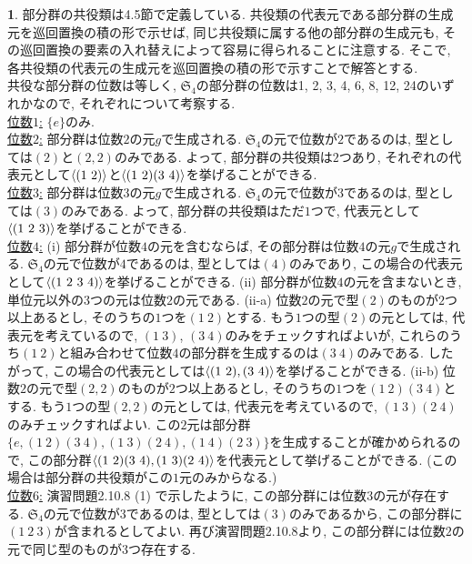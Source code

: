 \documentclass{amsart}
\theoremstyle{definition}
\newtheorem{ans}{}
\numberwithin{ans}{subsection}
\DeclarePairedDelimiter{\gen}{\langle}{\rangle}
\begin{document}
\begin{ans}
  部分群の共役類は4.5節で定義している.
  共役類の代表元である部分群の生成元を巡回置換の積の形で示せば, 同じ共役類に属する他の部分群の生成元も, その巡回置換の要素の入れ替えによって容易に得られることに注意する.
  そこで, 各共役類の代表元の生成元を巡回置換の積の形で示すことで解答とする.\\
  共役な部分群の位数は等しく, $\mathfrak{S}_4$の部分群の位数は1, 2, 3, 4, 6, 8, 12, 24のいずれかなので, それぞれについて考察する.\\
  \underline{位数$1$:}
  $\{e\}$のみ. \\
  \underline{位数$2$:}
  部分群は位数$2$の元$g$で生成される.
  $\mathfrak{S}_4$の元で位数が$2$であるのは, 型としては$(2)$と$(2, 2)$のみである.
  よって, 部分群の共役類は$2$つあり, それぞれの代表元として$\gen{(1\ 2)}$と$\gen{(1\ 2)(3\ 4)}$を挙げることができる.\\
  \underline{位数$3$:} 部分群は位数$3$の元$g$で生成される.
  $\mathfrak{S}_4$の元で位数が$3$であるのは, 型としては$(3)$のみである.
  よって, 部分群の共役類はただ$1$つで, 代表元として$\gen{(1\ 2\ 3)}$を挙げることができる.\\
  \underline{位数$4$:}
  (i) 部分群が位数$4$の元を含むならば, その部分群は位数$4$の元$g$で生成される.
  $\mathfrak{S}_4$の元で位数が$4$であるのは, 型としては$(4)$のみであり,
  この場合の代表元として$\gen{(1\ 2\ 3\ 4)}$を挙げることができる.
  (ii) 部分群が位数$4$の元を含まないとき, 単位元以外の$3$つの元は位数$2$の元である.
  (ii-a) 位数$2$の元で型$(2)$のものが$2$つ以上あるとし, そのうちの$1$つを$(1\ 2)$とする.
  もう$1$つの型$(2)$の元としては, 代表元を考えているので, $(1\ 3)$, $(3\ 4)$のみをチェックすればよいが,
  これらのうち$(1\ 2)$と組み合わせて位数$4$の部分群を生成するのは$(3\ 4)$のみである.
  したがって, この場合の代表元としては$\gen{(1\ 2), (3\ 4)}$を挙げることができる.
  (ii-b) 位数$2$の元で型$(2, 2)$のものが$2$つ以上あるとし, そのうちの$1$つを$(1\ 2)(3\ 4)$とする.
  もう$1$つの型$(2, 2)$の元としては, 代表元を考えているので, $(1\ 3)(2\ 4)$のみチェックすればよい.
  この$2$元は部分群$\{e, (1\ 2)(3\ 4), (1\ 3)(2\ 4), (1\ 4)(2\ 3)\}$を生成することが確かめられるので,
  この部分群$\gen{(1\ 2)(3\ 4), (1\ 3)(2\ 4)}$を代表元として挙げることができる.
  (この場合は部分群の共役類がこの$1$元のみからなる.)\\
  \underline{位数$6$:}
  演習問題2.10.8 (1) で示したように, この部分群には位数$3$の元が存在する.
  $\mathfrak{S}_4$の元で位数が$3$であるのは, 型としては$(3)$のみであるから,
  この部分群に$(1\ 2\ 3)$が含まれるとしてよい. 再び演習問題2.10.8より, この部分群には位数$2$の元で同じ型のものが$3$つ存在する.

\end{ans}
\end{document}
